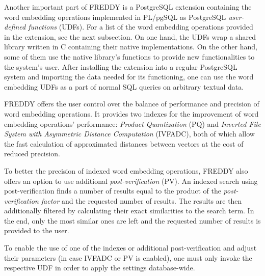 Another important part of FREDDY is a PostgreSQL extension containing the word embedding operations implemented in PL/pgSQL as PostgreSQL \textit{user-defined functions} (UDFs). For a list of the word embedding operations provided in the extension, see the next subsection. On one hand, the UDFs wrap a shared library written in C containing their native implementations. On the other hand, some of them use the native library's functions to provide new functionalities to the system's user. After installing the extension into a regular PostgreSQL system and importing the data needed for its functioning, one can use the word embedding UDFs as a part of normal SQL queries on arbitrary textual data. 

FREDDY offers the user control over the balance of performance and precision of word embedding operations. It provides two indexes for the improvement of word embedding operations' performance: \textit{Product Quantization} (PQ) and \textit{Inverted File System with Asymmetric Distance Computation} (IVFADC), both of which allow the fast calculation of approximated distances between vectors at the cost of reduced precision. 

To better the precision of indexed word embedding operations, FREDDY also offers an option to use additional \textit{post-verification} (PV). An indexed search using post-verification finds a number of results equal to the product of the \textit{post-verification factor} and the requested number of results. The results are then additionally filtered by calculating their exact similarities to the search term. In the end, only the most similar ones are left and the requested number of results is provided to the user.

To enable the use of one of the indexes or additional post-verification and adjust their parameters (in case IVFADC or PV is enabled), one must only invoke the respective UDF in order to apply the settings database-wide.

